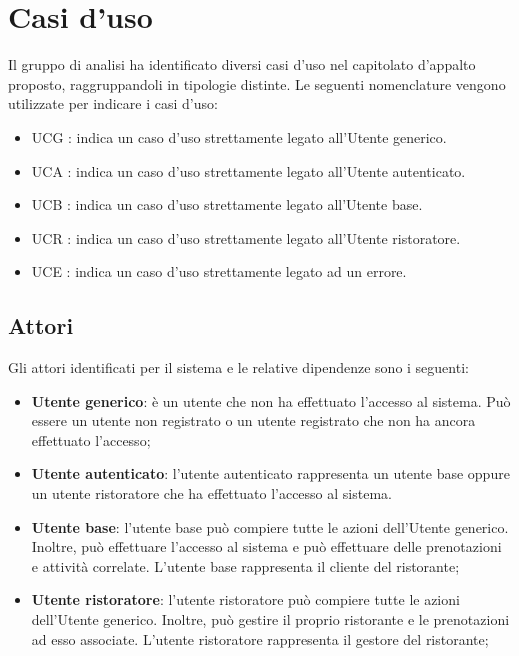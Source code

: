 \section{Casi d'uso}

Il gruppo di analisi ha identificato diversi casi d'uso nel capitolato d'appalto proposto, raggruppandoli in tipologie distinte. 
Le seguenti nomenclature vengono utilizzate per indicare i casi d'uso:

\begin{itemize}
	\item UCG : indica un caso d'uso strettamente legato all'Utente generico.
	\item UCA : indica un caso d'uso strettamente legato all'Utente autenticato.
	\item UCB : indica un caso d'uso strettamente legato all'Utente base.
	\item UCR : indica un caso d'uso strettamente legato all'Utente ristoratore.
	\item UCE : indica un caso d'uso strettamente legato ad un errore.
\end{itemize}

\subsection{Attori}

Gli attori identificati per il sistema e le relative dipendenze sono i seguenti:
\begin{itemize}
	\item \textbf{Utente generico}: è un utente che non ha effettuato l'accesso al
	      sistema. Può essere un utente non registrato o un utente registrato che non ha
	      ancora effettuato l'accesso;

	\item \textbf{Utente autenticato}: l'utente autenticato rappresenta un utente
	      base oppure un utente ristoratore che ha effettuato l'accesso al sistema.

	\item \textbf{Utente base}: l'utente base può compiere tutte le azioni
	      dell'Utente generico. Inoltre, può effettuare l'accesso al sistema e può
	      effettuare delle prenotazioni e attività correlate. L'utente base rappresenta
	      il cliente del ristorante;

	\item \textbf{Utente ristoratore}: l'utente ristoratore può compiere tutte le
	      azioni dell'Utente generico. Inoltre, può gestire il proprio ristorante e le
	      prenotazioni ad esso associate. L'utente ristoratore rappresenta il gestore del
	      ristorante;
\end{itemize}

